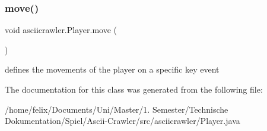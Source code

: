 \subsubsection{\texorpdfstring{move()}{move()}}
{\footnotesize\ttfamily void asciicrawler.\+Player.\+move (\begin{DoxyParamCaption}{ }\end{DoxyParamCaption})\hspace{0.3cm}{\ttfamily [inline]}}

defines the movements of the player on a specific key event 

The documentation for this class was generated from the following file\+:\begin{DoxyCompactItemize}
\item 
/home/felix/\+Documents/\+Uni/\+Master/1. Semester/\+Technische Dokumentation/\+Spiel/\+Ascii-\/\+Crawler/src/asciicrawler/Player.\+java\end{DoxyCompactItemize}

